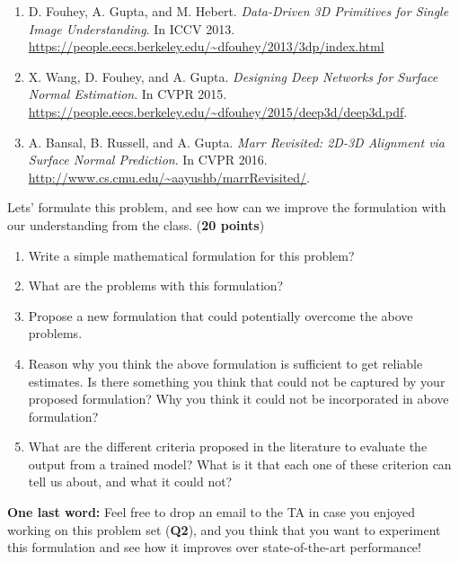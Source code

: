 \documentclass[11pt]{article}
\begin{document}
\begin{enumerate}
\item D. Fouhey, A. Gupta, and M. Hebert. \textit{Data-Driven 3D Primitives for Single Image Understanding}. In ICCV 2013. \url{https://people.eecs.berkeley.edu/~dfouhey/2013/3dp/index.html}
\item X. Wang, D. Fouhey, and A. Gupta. \textit{Designing Deep Networks for Surface Normal Estimation}. In CVPR 2015. \url{https://people.eecs.berkeley.edu/~dfouhey/2015/deep3d/deep3d.pdf}.
\item A. Bansal, B. Russell, and A. Gupta. \textit{Marr Revisited: 2D-3D Alignment via Surface Normal Prediction}. In CVPR 2016. \url{http://www.cs.cmu.edu/~aayushb/marrRevisited/}.
\end{enumerate}

Lets' formulate this problem, and see how can we improve the formulation with our understanding from the class. (\textbf{20 points})
\begin{enumerate}
\item Write a simple mathematical formulation for this problem?
\item What are the problems with this formulation?
\item Propose a new formulation that could potentially overcome the above problems.
\item Reason why you think the above formulation is sufficient to get reliable estimates. Is there something you think that could not be captured by your proposed formulation? Why you think it could not be incorporated in above formulation?
\item What are the different criteria proposed in the literature to evaluate the output from a trained model? What is it that each one of these criterion can tell us about, and what it could not?
\end{enumerate}

\noindent\textbf{One last word: } Feel free to drop an email to the TA in case you enjoyed working on this problem set (\textbf{Q2}), and you think that you want to experiment this formulation and see how it improves over state-of-the-art performance!
\end{document}
